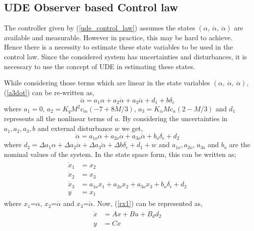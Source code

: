 \documentclass[conference]{IEEEtran}
\begin{document}
	\subsection{UDE Observer based Control law}
	
		 The controller given by (\ref{ude_control_law}) assumes the states $(\alpha,\ \dot{\alpha},\ \ddot{\alpha})$ are available and measurable. However in practice, this may be hard to achieve. Hence there is a necessity to estimate these state variables to be used in the control law. Since the considered system has uncertainties and disturbances, it is necessary to use the concept of UDE in estimating these states.
		 
		 While considering those terms which are linear in the state variables $(\alpha,\ \dot{\alpha},\ \ddot{\alpha})$, (\ref{a3dot}) can be re-written as, 
		\begin{equation}
			\dddot{\alpha} = a_1 \alpha + a_2 \dot{\alpha} + a_3 \ddot{\alpha} + d_1 + b\delta_c \label{a3dot_ss}
		\end{equation}	
		where $a_1 = 0$, $a_2 = K_q M^2 c_m(-7 + 8M/3)$, $a_3 = K_\alpha M c_n(2 - M/3)$ and $d_1$ represents all the nonlinear terms of $a$. By considering the uncertainties in $a_1, a_2, a_3, b$ and external disturbance $w$ we get,
		\begin{equation}
				\dddot{\alpha} = a_{1o} \alpha + a_{2o} \dot{\alpha} + a_{3o} \ddot{\alpha} + b_o\delta_c + d_2
		\end{equation}
		where $d_2 = \Delta{a_1}\alpha + \Delta{a_2}\dot{\alpha} + \Delta{a_3}\ddot{\alpha} + \Delta{b\delta}_c + d_1 + w$ and $a_{1o}, a_{2o}$, $a_{3o}$ and $b_o$ are the nominal values of the system. In the state space form, this can be written as;
		\begin{eqnarray}
			\begin{aligned}
				\dot{x}_1 &= x_2 \\
				\dot{x}_2 &= x_3 \\
				\dot{x}_3 &= a_{1o}x_1 + a_{2o}x_2 + a_{3o}x_3 + b_o \delta_c + d_2 \\
				y &= x_1 \label{rx1}
			\end{aligned}
		\end{eqnarray}
		where $x_1$=$\alpha$, $x_2$=$\dot{\alpha}$ and $x_3$=$\ddot{\alpha}$.
		Now, (\ref{rx1}) can be represented as,
		\begin{eqnarray}
			\begin{aligned}
				\dot{x} &= Ax + Bu + B_d d_2 \\
				y &= Cx \nonumber
			\end{aligned}
		\end{eqnarray}
\end{document}
